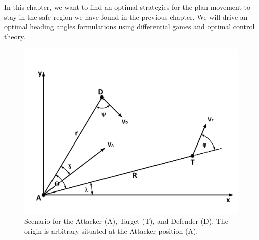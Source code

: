 \label{simulation}

In this chapter, we want to find an optimal strategies for the plan movement to stay in the safe region we have found in the previous chapter.  We will drive an optimal heading angles formulations using differential games and optimal control theory.


\begin{figure}[H]
	\centering
	\includegraphics[width=1.0\textwidth]{fig/fig7-1.pdf}
	\caption{Scenario for the Attacker (A), Target (T), and Defender (D). The origin is arbitrary situated at the Attacker position (A).}
	\label{7.1}
\end{figure}

